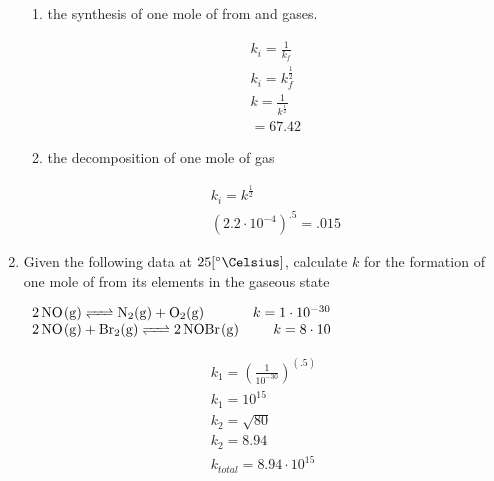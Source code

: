 \documentclass[12pt]{article}
\begin{document}
\begin{enumerate}
    \begin{center}
    \end{center}

    \begin{enumerate}

      \item the synthesis of one mole of  from  and  gases.

        \begin{equation}
          \begin{split}
            k_i=\frac{1}{k_f}\\
            k_i=k_f^{\frac{1}{2}}\\
            k=\frac{1}{k^{\frac{1}{2}}}\\
            =67.42
          \end{split}
          \label{5}
        \end{equation}

      \item the decomposition of one mole of  gas

        \begin{equation}
          \begin{split}
            k_i=k^{\frac{1}{2}}\\
            \left(2.2\cdot10^{-4}\right)^{.5}=.015
          \end{split}
          \label{6}
        \end{equation}

    \end{enumerate}

    \setcounter{enumi}{17}

  \item Given the following data at $25[\si{\degree\Celsius}]$, calculate $k$ for the formation of one mole of  from its elements in the gaseous state

    \begin{center}
      $\begin{array}{l r}
        \ce{2NO(g) <=> N2(g) + O2(g)} & k=1\cdot10^{-30}\\
        \ce{2NO(g) + Br2(g) <=> 2NOBr(g)} & k=8\cdot10\\
      \end{array}$
    \end{center}

    \begin{equation}
      \begin{split}
        k_1=\left(\frac{1}{10^{-30}}\right)^(.5)\\
        k_1=10^{15}\\
        k_2=\sqrt{80}\\
        k_2=8.94\\
        k_{total}=8.94\cdot10^15
      \end{split}
      \label{7}
    \end{equation}


\end{enumerate}
\end{document}
